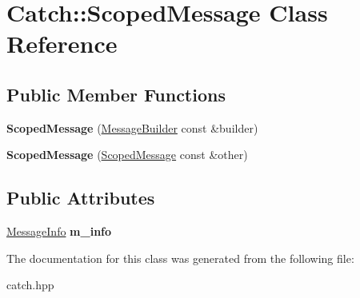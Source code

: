 \hypertarget{classCatch_1_1ScopedMessage}{
\section{Catch::ScopedMessage Class Reference}
\label{classCatch_1_1ScopedMessage}
}
\subsection*{Public Member Functions}
\begin{DoxyCompactItemize}
\item 
\hypertarget{classCatch_1_1ScopedMessage_a5cc59f0f2ebe840e6607f83004d49a17}{
{\bfseries ScopedMessage} (\hyperlink{structCatch_1_1MessageBuilder}{MessageBuilder} const \&builder)}
\label{classCatch_1_1ScopedMessage_a5cc59f0f2ebe840e6607f83004d49a17}

\item 
\hypertarget{classCatch_1_1ScopedMessage_ae03a17fd47220d563d4abc73e7518e29}{
{\bfseries ScopedMessage} (\hyperlink{classCatch_1_1ScopedMessage}{ScopedMessage} const \&other)}
\label{classCatch_1_1ScopedMessage_ae03a17fd47220d563d4abc73e7518e29}

\end{DoxyCompactItemize}
\subsection*{Public Attributes}
\begin{DoxyCompactItemize}
\item 
\hypertarget{classCatch_1_1ScopedMessage_ae6e1476f389cc6e1586f033b3747b27b}{
\hyperlink{structCatch_1_1MessageInfo}{MessageInfo} {\bfseries m\_\-info}}
\label{classCatch_1_1ScopedMessage_ae6e1476f389cc6e1586f033b3747b27b}

\end{DoxyCompactItemize}


The documentation for this class was generated from the following file:\begin{DoxyCompactItemize}
\item 
catch.hpp\end{DoxyCompactItemize}
